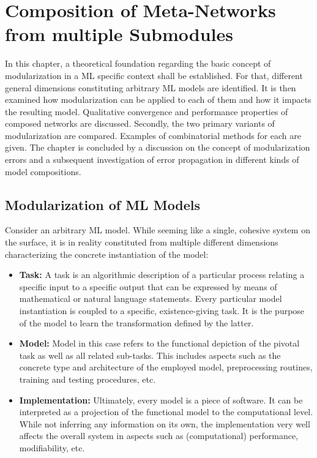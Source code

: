 \cleardoublepage

\section{Composition of Meta-Networks from multiple Submodules%
         \label{sec:compnet}}

In this chapter, a theoretical foundation regarding the basic concept of modularization in a ML specific context shall be established. For that, different general dimensions constituting arbitrary ML models are identified. It is then examined how modularization can be applied to each of them and how it impacts the resulting model. Qualitative convergence and performance properties of composed networks are discussed. Secondly, the two primary variants of modularization are compared. Examples of combinatorial methods for each are given. The chapter is concluded by a discussion on the concept of modularization errors and a subsequent investigation of error propagation in different kinds of model compositions.

\subsection{Modularization of ML Models%
            \label{sec:compnet_modularization}}

Consider an arbitrary ML model. While seeming like a single, cohesive system on the surface, it is in reality constituted from multiple different dimensions characterizing the concrete instantiation of the model:
            
\begin{itemize}
    \item \textbf{Task:} A task is an algorithmic description of a particular process relating a specific input to a specific output that can be expressed by means of mathematical or natural language statements. Every particular model instantiation is coupled to a specific, existence-giving task. It is the purpose of the model to learn the transformation defined by the latter.
    \item \textbf{Model:} Model in this case refers to the functional depiction of the pivotal task as well as all related sub-tasks. This includes aspects such as the concrete type and architecture of the employed model, preprocessing routines, training and testing procedures, etc.
    \item \textbf{Implementation:} Ultimately, every model is a piece of software. It can be interpreted as a projection of the functional model to the computational level. While not inferring any information on its own, the implementation very well affects the overall system in aspects such as (computational) performance, modifiability, etc.
\end{itemize}          
            
